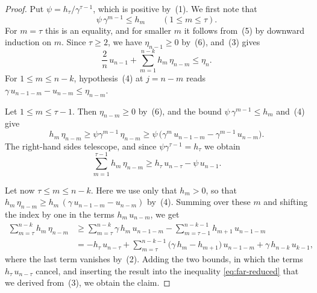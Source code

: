 \documentclass{amsart}
\theoremstyle{definition}
\theoremstyle{remark}
\numberwithin{equation}{section}
\begin{document}
\begin{proof}
Put $\psi=h_\tau/\gamma^{\tau-1}$, which is positive by~(1). We first note that
\[
\psi\,\gamma^{m-1}\le h_m\qquad(1\le m\le\tau).
\]
For $m=\tau$ this is an equality, and for smaller $m$ it follows from~(5) by downward induction on $m$. Since $\tau\ge 2$, we have $\eta_{n-1}\ge 0$ by~(6), and~(3) gives
\begin{equation}\label{eq:far-reduced}
\frac2n\,u_{n-1}+\sum_{m=1}^{n-k}h_m\,\eta_{n-m}\le\eta_n .
\end{equation}
For $1\le m\le n-k$, hypothesis~(4) at $j=n-m$ reads $\gamma\,u_{n-1-m}-u_{n-m}\le\eta_{n-m}$.

Let $1\le m\le\tau-1$. Then $\eta_{n-m}\ge 0$ by~(6), and the bound $\psi\,\gamma^{m-1}\le h_m$ and~(4) give
\[
h_m\,\eta_{n-m}\ge\psi\gamma^{m-1}\,\eta_{n-m}\ge\psi\,\bigl(\gamma^{m}\,u_{n-1-m}-\gamma^{m-1}\,u_{n-m}\bigr).
\]
The right-hand sides telescope, and since $\psi\gamma^{\tau-1}=h_\tau$ we obtain
\[
\sum_{m=1}^{\tau-1}h_m\,\eta_{n-m}\ge h_\tau\,u_{n-\tau}-\psi\,u_{n-1}.
\]

Let now $\tau\le m\le n-k$. Here we use only that $h_m>0$, so that $h_m\,\eta_{n-m}\ge h_m\,(\gamma\,u_{n-1-m}-u_{n-m})$ by~(4). Summing over these $m$ and shifting the index by one in the terms $h_m\,u_{n-m}$, we get
\begin{align*}
\sum_{m=\tau}^{n-k}h_m\,\eta_{n-m}&\ge\sum_{m=\tau}^{n-k}\gamma\,h_m\,u_{n-1-m}-\sum_{m=\tau-1}^{n-k-1}h_{m+1}\,u_{n-1-m}\\
&=-h_\tau\,u_{n-\tau}+\sum_{m=\tau}^{n-k-1}\bigl(\gamma\,h_m-h_{m+1}\bigr)\,u_{n-1-m}+\gamma\,h_{n-k}\,u_{k-1},
\end{align*}
where the last term vanishes by~(2). Adding the two bounds, in which the terms $h_\tau\,u_{n-\tau}$ cancel, and inserting the result into the inequality \eqref{eq:far-reduced} that we derived from~(3), we obtain the claim.
\end{proof}
\end{document}
